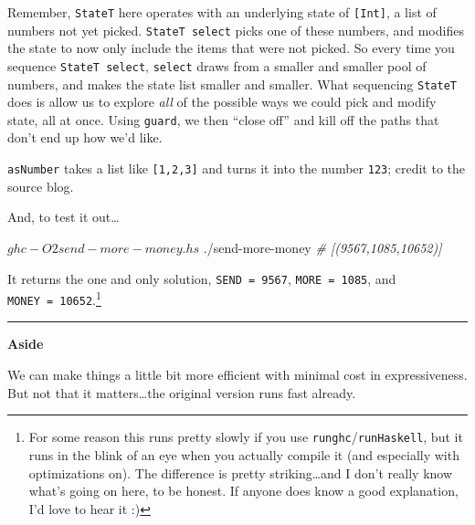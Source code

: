 \documentclass[]{article}
\newenvironment{Shaded}{}{}
\newcommand{\CommentTok}[1]{\textcolor[rgb]{0.38,0.63,0.69}{\textit{#1}}}
\newcommand{\ExtensionTok}[1]{#1}
\newcommand{\NormalTok}[1]{#1}
\begin{document}
Remember, \texttt{StateT} here operates with an underlying state of
\texttt{{[}Int{]}}, a list of numbers not yet picked. \texttt{StateT\ select}
picks one of these numbers, and modifies the state to now only include the items
that were not picked. So every time you sequence \texttt{StateT\ select},
\texttt{select} draws from a smaller and smaller pool of numbers, and makes the
state list smaller and smaller. What sequencing \texttt{StateT} does is allow us
to explore \emph{all} of the possible ways we could pick and modify state, all
at once. Using \texttt{guard}, we then ``close off'' and kill off the paths that
don't end up how we'd like.

\texttt{asNumber} takes a list like \texttt{{[}1,2,3{]}} and turns it into the
number \texttt{123}; credit to the source blog.

And, to test it out\ldots{}

\begin{Shaded}
\begin{Highlighting}[]
\NormalTok{$ }\ExtensionTok{ghc}\NormalTok{ {-}O2 send{-}more{-}money.hs}
\NormalTok{$ }\ExtensionTok{./send{-}more{-}money}
\CommentTok{\# [(9567,1085,10652)]}
\end{Highlighting}
\end{Shaded}

It returns the one and only solution, \texttt{SEND\ =\ 9567},
\texttt{MORE\ =\ 1085}, and \texttt{MONEY\ =\ 10652}.\footnote{For some reason
  this runs pretty slowly if you use \texttt{runghc}/\texttt{runHaskell}, but it
  runs in the blink of an eye when you actually compile it (and especially with
  optimizations on). The difference is pretty striking\ldots and I don't really
  know what's going on here, to be honest. If anyone does know a good
  explanation, I'd love to hear it :)}

\begin{center}\rule{0.5\linewidth}{\linethickness}\end{center}

\textbf{Aside}

We can make things a little bit more efficient with minimal cost in
expressiveness. But not that it matters\ldots the original version runs fast
already.
\end{document}
